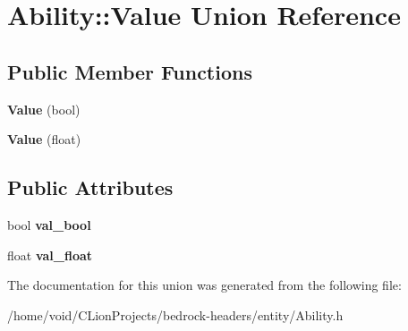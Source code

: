 \hypertarget{union_ability_1_1_value}{}\section{Ability\+::Value Union Reference}
\label{union_ability_1_1_value}
\subsection*{Public Member Functions}
\begin{DoxyCompactItemize}
\item 
\mbox{\label{union_ability_1_1_value_a228f7577a93d935bd333debfeca19038}} 
{\bfseries Value} (bool)
\item 
\mbox{\label{union_ability_1_1_value_acb4f8783b48b6f3218e636c7b851f575}} 
{\bfseries Value} (float)
\end{DoxyCompactItemize}
\subsection*{Public Attributes}
\begin{DoxyCompactItemize}
\item 
\mbox{\label{union_ability_1_1_value_a075f1d27e792229a437b0250c55d56e4}} 
bool {\bfseries val\+\_\+bool}
\item 
\mbox{\label{union_ability_1_1_value_a79b7a1badcdd0ce75da42f203b3cfe07}} 
float {\bfseries val\+\_\+float}
\end{DoxyCompactItemize}


The documentation for this union was generated from the following file\+:\begin{DoxyCompactItemize}
\item 
/home/void/\+C\+Lion\+Projects/bedrock-\/headers/entity/Ability.\+h\end{DoxyCompactItemize}
